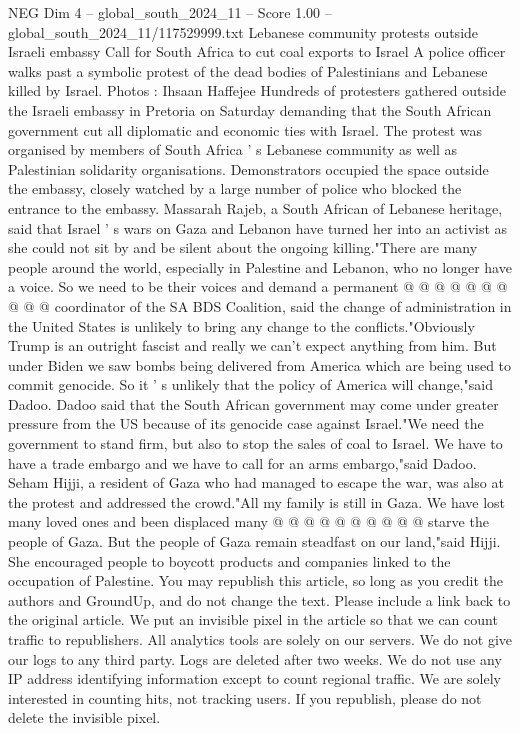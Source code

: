 \begin{textsample}{NEG Dim 4 – global\_south\_2024\_11 – Score 1.00 – global\_south\_2024\_11/117529999.txt}  \label{ex:f4_neg_172}
Lebanese community protests outside Israeli embassy Call for South Africa to cut coal exports to Israel A police officer walks past a symbolic protest of the dead bodies of Palestinians and Lebanese killed by Israel.
Photos : Ihsaan Haffejee Hundreds of protesters gathered outside the Israeli embassy in Pretoria on Saturday demanding that the South African government cut all diplomatic and economic ties with Israel.
The protest was organised by members of South Africa ' s Lebanese community as well as Palestinian solidarity organisations.
Demonstrators occupied the space outside the embassy, closely watched by a large number of police who blocked the entrance to the embassy.
Massarah Rajeb, a South African of Lebanese heritage, said that Israel ' s wars on Gaza and Lebanon have turned her into an activist as she could not sit by and be silent about the ongoing killing."There are many people around the world, especially in Palestine and Lebanon, who no longer have a voice.
So we need to be their voices and demand a permanent @ @ @ @ @ @ @ @ @ @ coordinator of the SA BDS Coalition, said the change of administration in the United States is unlikely to bring any change to the conflicts."Obviously Trump is an outright fascist and really we can't expect anything from him.
But under Biden we saw bombs being delivered from America which are being used to commit genocide.
So it ' s unlikely that the policy of America will change,"said Dadoo.
Dadoo said that the South African government may come under greater pressure from the US because of its genocide case against Israel."We need the government to stand firm, but also to stop the sales of coal to Israel.
We have to have a trade embargo and we have to call for an arms embargo,"said Dadoo.
Seham Hijji, a resident of Gaza who had managed to escape the war, was also at the protest and addressed the crowd."All my family is still in Gaza.
We have lost many loved ones and been displaced many @ @ @ @ @ @ @ @ @ @ starve the people of Gaza.
But the people of Gaza remain steadfast on our land,"said Hijji.
She encouraged people to boycott products and companies linked to the occupation of Palestine.
You may republish this article, so long as you credit the authors and GroundUp, and do not change the text.
Please include a link back to the original article.
We put an invisible pixel in the article so that we can count traffic to republishers.
All analytics tools are solely on our servers.
We do not give our logs to any third party.
Logs are deleted after two weeks.
We do not use any IP address identifying information except to count regional traffic.
We are solely interested in counting hits, not tracking users.
If you republish, please do not delete the invisible pixel.

\end{textsample}
